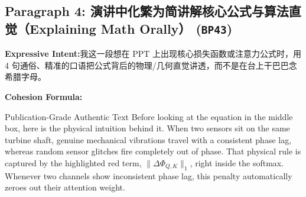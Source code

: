 \subsection*{Paragraph 4: 演讲中化繁为简讲解核心公式与算法直觉（Explaining Math Orally） (\texttt{BP43})}
\noindent\textbf{Expressive Intent:}\enspace 我这一段想在 PPT 上出现核心损失函数或注意力公式时，用 4 句通俗、精准的口语把公式背后的物理/几何直觉讲透，而不是在台上干巴巴念希腊字母。\par
\noindent\textbf{Cohesion Formula:}\par\vspace{4pt}
\begin{ExampleBox}{Publication-Grade Authentic Text}
Before looking at the equation in the middle box, here is the physical intuition behind it. When two sensors sit on the same turbine shaft, genuine mechanical vibrations travel with a consistent phase lag, whereas random sensor glitches fire completely out of phase. That physical rule is captured by the highlighted red term, $\|\Delta \Phi_{Q,K}\|_1$, right inside the softmax. Whenever two channels show inconsistent phase lag, this penalty automatically zeroes out their attention weight.
\end{ExampleBox}
